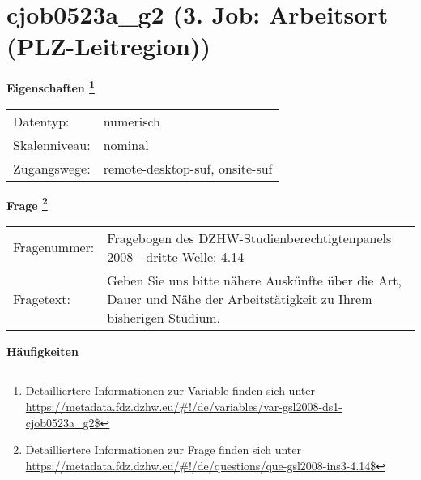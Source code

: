 
    \setcounter{footnote}{0}

    \vspace*{-1.8cm}
	\section{cjob0523a\_g2 (3. Job: Arbeitsort (PLZ-Leitregion))}
	\label{section:cjob0523a_g2}



    \vspace*{0.5cm}
    \noindent\textbf{Eigenschaften
	\footnote{Detailliertere Informationen zur Variable finden sich unter
		\url{https://metadata.fdz.dzhw.eu/\#!/de/variables/var-gsl2008-ds1-cjob0523a_g2$}}}\\
	\begin{tabularx}{\hsize}{@{}lX}
	Datentyp: & numerisch \\
	Skalenniveau: & nominal \\
	Zugangswege: &
	  remote-desktop-suf, 
	  onsite-suf
 \\
    \end{tabularx}



				\vspace*{0.5cm}
                \noindent\textbf{Frage
	                \footnote{Detailliertere Informationen zur Frage finden sich unter
		              \url{https://metadata.fdz.dzhw.eu/\#!/de/questions/que-gsl2008-ins3-4.14$}}}\\
				\begin{tabularx}{\hsize}{@{}lX}
					Fragenummer: &
					  Fragebogen des DZHW-Studienberechtigtenpanels 2008 - dritte Welle:
					  4.14
 \\
					Fragetext: & Geben Sie uns bitte nähere Auskünfte über die Art, Dauer und Nähe der Arbeitstätigkeit zu Ihrem bisherigen Studium. \\
				\end{tabularx}





        		\vspace*{0.5cm}
                \noindent\textbf{Häufigkeiten}

